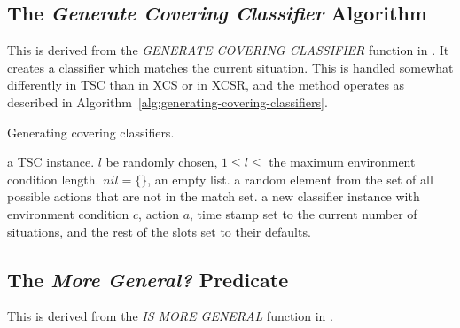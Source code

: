\subsection{The \emph{Generate Covering Classifier} Algorithm}
This is derived from the \emph{GENERATE COVERING CLASSIFIER} function in \cite{ButzWilson}.
It creates a classifier which matches the current situation.
This is handled somewhat differently in TSC than in XCS or in XCSR, and the method operates as described in Algorithm~\ref{alg:generating-covering-classifiers}.
\begin{algorithm}
\caption{Generating covering classifiers.}
\begin{algorithmic}[1]
\label{alg:generating-covering-classifiers}
\INPUT a TSC instance.
\LET $l$ be randomly chosen, $1 \le l \le $ the maximum environment condition length.
 $nil = \{\}$, an empty list.
 a random element from the set of all possible actions that are not in the match set.
\ENDFOR
\RETURN a new classifier instance with environment condition $c$, action $a$, time stamp set to the current number of situations, and the rest of the slots set to their defaults. 
\end{algorithmic}
\end{algorithm}



\subsection{The \emph{More General?} Predicate}
\label{sec:more-general?}
This is derived from the \emph{IS MORE GENERAL} function in \cite{ButzWilson}.

